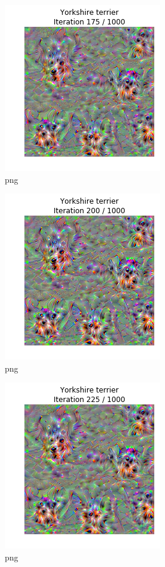 \documentclass[]{book}
\theoremstyle{definition}
\theoremstyle{definition}
\theoremstyle{definition}
\theoremstyle{remark}
\begin{document}
\begin{figure}
\centering
\includegraphics{Network-Visualization-TensorFlow_files/Network-Visualization-TensorFlow_24_8.png}
\caption{png}
\end{figure}

\begin{figure}
\centering
\includegraphics{Network-Visualization-TensorFlow_files/Network-Visualization-TensorFlow_24_9.png}
\caption{png}
\end{figure}

\begin{figure}
\centering
\includegraphics{Network-Visualization-TensorFlow_files/Network-Visualization-TensorFlow_24_10.png}
\caption{png}
\end{figure}
\end{document}
